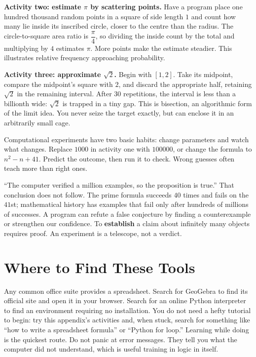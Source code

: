 \textbf{Activity two: estimate $\pi$ by scattering points.} Have a program place one hundred thousand random points in a square of side length $1$ and count how many lie inside its inscribed circle, closer to the centre than the radius. The circle-to-square area ratio is $\dfrac{\pi}{4}$, so dividing the inside count by the total and multiplying by $4$ estimates $\pi$. More points make the estimate steadier. This illustrates relative frequency approaching probability.

\textbf{Activity three: approximate $\sqrt{2}$.} Begin with $[1,2]$. Take its midpoint, compare the midpoint's square with $2$, and discard the appropriate half, retaining $\sqrt{2}$ in the remaining interval. After $30$ repetitions, the interval is less than a billionth wide: $\sqrt{2}$ is trapped in a tiny gap. This is bisection, an algorithmic form of the limit idea. You never seize the target exactly, but can enclose it in an arbitrarily small cage.

Computational experiments have two basic habits: change parameters and watch what changes. Replace $1000$ in activity one with $100000$, or change the formula to $n^2-n+41$. Predict the outcome, then run it to check. Wrong guesses often teach more than right ones.

\begin{fanli}
``The computer verified a million examples, so the proposition is true.'' That conclusion does not follow. The prime formula succeeds $40$ times and fails on the $41$st; mathematical history has examples that fail only after hundreds of millions of successes. A program can refute a false conjecture by finding a counterexample or strengthen our confidence. To \textbf{establish} a claim about infinitely many objects requires proof. An experiment is a telescope, not a verdict.
\end{fanli}

\section{Where to Find These Tools}

Any common office suite provides a spreadsheet. Search for GeoGebra to find its official site and open it in your browser. Search for an online Python interpreter to find an environment requiring no installation. You do not need a hefty tutorial to begin: try this appendix's activities and, when stuck, search for something like ``how to write a spreadsheet formula'' or ``Python for loop.'' Learning while doing is the quickest route. Do not panic at error messages. They tell you what the computer did not understand, which is useful training in logic in itself.

